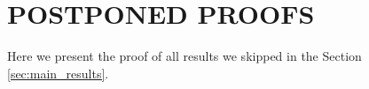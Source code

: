 \section{POSTPONED PROOFS}
\label{sec:postponed_proofs}
Here we present the proof of all results we skipped in the Section \ref{sec:main_results}.


    
    
    



